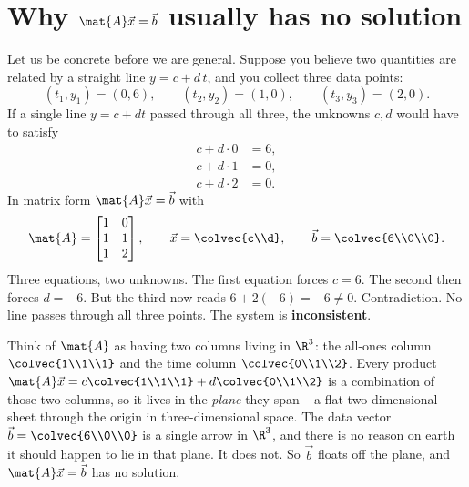 \section{Why \texorpdfstring{$\mat{A}\vec{x}=\vec{b}$}{Ax=b} usually has no solution}

Let us be concrete before we are general. Suppose you believe two quantities are related by a
straight line $y = c + d\,t$, and you collect three data points:
\[
  (t_1,y_1)=(0,6),\qquad (t_2,y_2)=(1,0),\qquad (t_3,y_3)=(2,0).
\]
If a single line $y=c+dt$ passed through all three, the unknowns $c,d$ would have to satisfy
\[
  \begin{aligned}
    c + d\cdot 0 &= 6,\\
    c + d\cdot 1 &= 0,\\
    c + d\cdot 2 &= 0.
  \end{aligned}
\]
In matrix form $\mat{A}\vec{x}=\vec{b}$ with
\[
  \mat{A}=\begin{bmatrix} 1 & 0\\ 1 & 1\\ 1 & 2\end{bmatrix},
  \qquad
  \vec{x}=\colvec{c\\d},
  \qquad
  \vec{b}=\colvec{6\\0\\0}.
\]
Three equations, two unknowns. The first equation forces $c=6$. The second then forces $d=-6$.
But the third now reads $6 + 2(-6) = -6 \ne 0$. Contradiction. No line passes through all three
points. The system is \textbf{inconsistent}.

\begin{intuitionbox}
Think of $\mat{A}$ as having two columns living in $\R^3$: the all-ones column $\colvec{1\\1\\1}$
and the time column $\colvec{0\\1\\2}$. Every product $\mat{A}\vec{x}=c\colvec{1\\1\\1}
+d\colvec{0\\1\\2}$ is a combination of those two columns, so it lives in the \emph{plane} they
span -- a flat two-dimensional sheet through the origin in three-dimensional space. The data
vector $\vec{b}=\colvec{6\\0\\0}$ is a single arrow in $\R^3$, and there is no reason on earth it
should happen to lie in that plane. It does not. So $\vec{b}$ floats off the plane, and
$\mat{A}\vec{x}=\vec{b}$ has no solution.
\end{intuitionbox}

